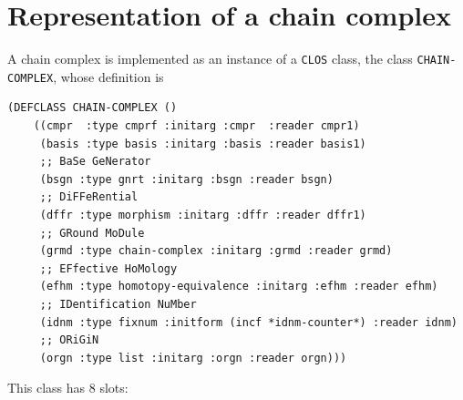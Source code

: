 \section {Representation of a chain complex}

A chain complex is implemented as an instance of a {\tt CLOS} class, 
the class {\tt CHAIN-COMPLEX}, whose definition is
{\footnotesize\begin{verbatim}
(DEFCLASS CHAIN-COMPLEX ()
    ((cmpr  :type cmprf :initarg :cmpr  :reader cmpr1)
     (basis :type basis :initarg :basis :reader basis1)
     ;; BaSe GeNerator
     (bsgn :type gnrt :initarg :bsgn :reader bsgn)
     ;; DiFFeRential
     (dffr :type morphism :initarg :dffr :reader dffr1)
     ;; GRound MoDule
     (grmd :type chain-complex :initarg :grmd :reader grmd)
     ;; EFfective HoMology
     (efhm :type homotopy-equivalence :initarg :efhm :reader efhm)
     ;; IDentification NuMber
     (idnm :type fixnum :initform (incf *idnm-counter*) :reader idnm)
     ;; ORiGiN
     (orgn :type list :initarg :orgn :reader orgn)))
\end{verbatim}}
This class has $8$ slots:
